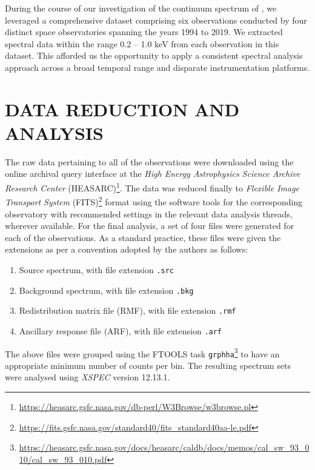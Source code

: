 		During the course of our investigation of the continuum spectrum of \source, we leveraged a comprehensive dataset comprising six observations conducted by four distinct space observatories spanning the years 1994 to 2019. We extracted spectral data within the range 0.2 -- 1.0 keV from each observation in this dataset. This afforded us the opportunity to apply a consistent spectral analysis approach across a broad temporal range and disparate instrumentation platforms.
    
    \section{\MakeUppercase{Data Reduction and Analysis}} \label{multi-obs:red-analysis}
    	The raw data pertaining to all of the observations were downloaded using the online archival query interface at the \textit{High Energy Astrophysics Science Archive Research Center} (HEASARC)\footnote{\url{https://heasarc.gsfc.nasa.gov/db-perl/W3Browse/w3browse.pl}}. The data was reduced finally to \textit{Flexible Image Transport System} (FITS)\footnote{\url{https://fits.gsfc.nasa.gov/standard40/fits_standard40aa-le.pdf}} format using the software tools for the corresponding observatory with recommended settings in the relevant data analysis threads, wherever available. For the final analysis, a set of four files were generated for each of the observations. As a standard practice, these files were given the extensions as per a convention adopted by the authors as follows:
	    \begin{enumerate}
	    	\item Source spectrum, with file extension \texttt{.src}
	    	\item Background spectrum, with file extension \texttt{.bkg}
	    	\item Redistribution matrix file (RMF), with file extension \texttt{.rmf}
	    	\item Ancillary response file (ARF), with file extension \texttt{.arf}
	    \end{enumerate}
	    The above files were grouped using the FTOOLS task \texttt{grphha}\footnote{\url{https://heasarc.gsfc.nasa.gov/docs/heasarc/caldb/docs/memos/cal_sw_93_010/cal_sw_93_010.pdf}} to have an appropriate minimum number of counts per bin. The resulting spectrum sets were analysed using \textit{XSPEC} version 12.13.1.
    
